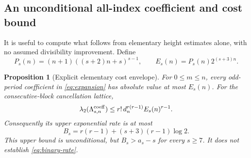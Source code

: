\documentclass[11pt]{article}
\newtheorem{proposition}[theorem]{Proposition}
\theoremstyle{remark}
\begin{document}
\subsection{An unconditional all-index coefficient and cost bound}
It is useful to compute what follows from elementary height estimates
alone, with no assumed divisibility improvement. Define
\[
 P_s(n)=(n+1)((s+2)n+s)^{s-1},\qquad
 E_s(n)=P_s(n)2^{(s+3)n}.
\]
\begin{proposition}[Explicit elementary cost envelope]
\label{prop:elementary-cost}
For \(0\le m\le n\), every odd-period coefficient in
\eqref{eq:expansion} has absolute value at most \(E_s(n)\).
For the consecutive-block cancellation lattice,
\begin{equation}
 \lambda_2(\Lambda^{\rm coeff}_{s,n})
 \le r!\,d_n^{r(r-1)}E_s(n)^{r-1}.
 \label{eq:coarse-cost}
\end{equation}
Consequently its upper exponential rate is at most
\[
 B_s=r(r-1)+(s+3)(r-1)\log2.
\]
This upper bound is unconditional, but \(B_s>a_s-s\) for every
\(s\ge7\). It does not establish \eqref{eq:binary-rate}.
\end{proposition}
\end{document}
